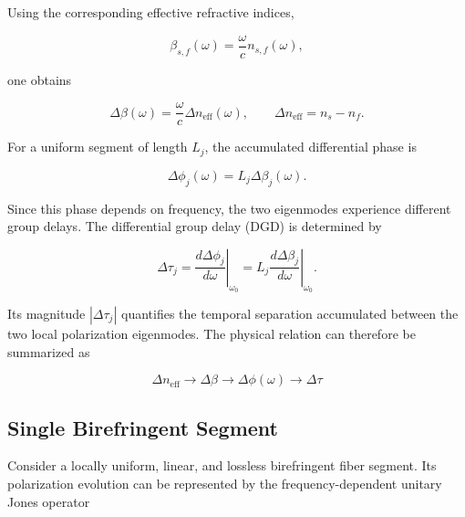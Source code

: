 Using the corresponding effective refractive indices,

\begin{equation}
\beta_{s,f}(\omega)
=
\frac{\omega}{c}
n_{s,f}(\omega),
\end{equation}

one obtains

\begin{equation}
\Delta\beta(\omega)
=
\frac{\omega}{c}
\Delta n_{\mathrm{eff}}(\omega),
\qquad
\Delta n_{\mathrm{eff}}
=
n_s-n_f.
\label{eq:differential_beta_refractive_index}
\end{equation}

For a uniform segment of length \(L_j\), the accumulated differential phase is

\begin{equation}
\Delta\phi_j(\omega)
=
L_j\Delta\beta_j(\omega).
\label{eq:differential_phase_beta_relation}
\end{equation}

Since this phase depends on frequency, the two eigenmodes experience different
group delays. The differential group delay (DGD) is determined by

\begin{equation}
\Delta\tau_j
=
\left.
\frac{d\Delta\phi_j}{d\omega}
\right|_{\omega_0}
=
L_j
\left.
\frac{d\Delta\beta_j}{d\omega}
\right|_{\omega_0}.
\label{eq:dgd_phase_derivative}
\end{equation}

Its magnitude \( |\Delta\tau_j| \) quantifies the temporal separation accumulated
between the two local polarization eigenmodes. The physical relation can therefore
be summarized as

\begin{equation}
\boxed{
\Delta n_{\mathrm{eff}}
\longrightarrow
\Delta\beta
\longrightarrow
\Delta\phi(\omega)
\longrightarrow
\Delta\tau
}
\label{eq:birefringence_to_dgd_chain}
\end{equation}



\subsection{Single Birefringent Segment}
\label{subsec:single_birefringent_segment}

Consider a locally uniform, linear, and lossless birefringent fiber segment. Its
polarization evolution can be represented by the frequency-dependent unitary
Jones operator

